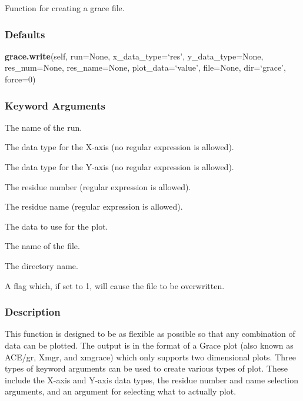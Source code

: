 Function for creating a grace  file.



\subsubsection{Defaults}

\textsf{\textbf{grace.write}(self, run=None, x\_data\_type=`res', y\_data\_type=None, res\_num=None, res\_name=None, plot\_data=`value', file=None, dir=`grace', force=0)}


\subsubsection{Keyword Arguments}

  The name of the run. 

  The data type for the X-axis (no regular expression is allowed). 

  The data type for the Y-axis (no regular expression is allowed). 

  The residue number (regular expression is allowed). 

  The residue name (regular expression is allowed). 

  The data to use for the plot. 

  The name of the file. 

  The directory name. 

  A flag which, if set to 1, will cause the file to be overwritten. 




\subsubsection{Description}

This function is designed to be as flexible as possible so that any combination of data can be plotted.  The output is in the format of a Grace plot (also known as ACE/gr, Xmgr, and xmgrace) which only supports two dimensional plots.  Three types of keyword arguments can be used to create various types of plot.  These include the X-axis and Y-axis data types, the residue number and name selection arguments, and an argument for selecting what to actually plot.


